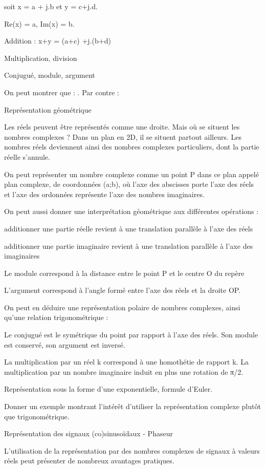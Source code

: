 \documentclass[]{article}
\begin{document}
soit x = a + j.b et y = c+j.d.

Re(x) = a, Im(x) = b.

Addition : x+y = (a+c) +j.(b+d)

Multiplication, division

Conjugué, module, argument

On peut montrer que : . Par contre :~

Représentation géométrique

Les réels peuvent être représentés comme une droite. Mais où se situent
les nombres complexes ? Dans un plan en 2D, il se situent partout
ailleurs. Les nombres réels deviennent ainsi des nombres complexes
particuliers, dont la partie réelle s'annule.

On peut représenter un nombre complexe comme un point P dans ce plan
appelé plan complexe, de coordonnées (a;b), où l'axe des abscisses porte
l'axe des réels et l'axe des ordonnées représente l'axe des nombres
imaginaires.

On peut aussi donner une interprétation géométrique aux différentes
opérations :

additionner une partie réelle revient à une translation parallèle à
l'axe des réels

additionner une partie imaginaire revient à une translation parallèle à
l'axe des imaginaires

Le module correspond à la distance entre le point P et le centre O du
repère

L'argument correspond à l'angle formé entre l'axe des réels et la droite
OP.

On peut en déduire une représentation polaire de nombres complexes,
ainsi qu'une relation trigonométrique :

Le conjugué est le symétrique du point par rapport à l'axe des réels.
Son module est conservé, son argument est inversé.

La multiplication par un réel k correspond à une homothétie de rapport
k. La multiplication par un nombre imaginaire induit en plus une
rotation de π/2.~

Représentation sous la forme d'une exponentielle, formule d'Euler.

Donner un exemple montrant l'intérêt d'utiliser la représentation
complexe plutôt que trigonométrique.

Représentation des signaux (co)sinusoïdaux - Phaseur

L'utilisation de la représentation par des nombres complexes de signaux
à valeurs réels peut présenter de nombreux avantages pratiques.
\end{document}
